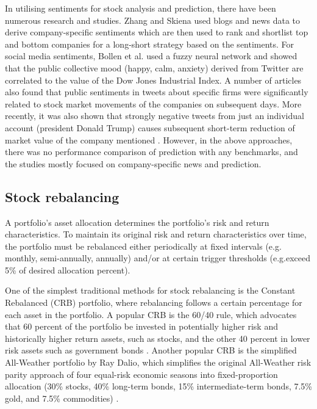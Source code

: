 \documentclass{article}
\begin{document}
In utilising sentiments for stock analysis and prediction, there have been numerous research and studies. Zhang and Skiena \cite{zhang2010trading} used blogs and news data to derive company-specific sentiments which are then used to rank and shortlist top and bottom companies for a long-short strategy based on the sentiments. For social media sentiments, Bollen et al. \cite{Bollen2011} used a fuzzy neural network and showed that the public collective mood (happy, calm, anxiety) derived from Twitter are correlated to the value of the Dow Jones Industrial Index. A number of articles \cite{pagolu2016, SulTwitter2017} also found that public sentiments in tweets about specific firms were significantly related to stock market movements of the companies on subsequent days. More recently, it was also shown that strongly negative tweets from just an individual account (president Donald Trump) causes subsequent short-term reduction of market value of the company mentioned \cite{DonaldTrumpTwitter}. However, in the above approaches, there was no performance comparison of prediction with any benchmarks, and the studies mostly focused on company-specific news and prediction.

\subsection{Stock rebalancing}
A portfolio's asset allocation determines the portfolio's risk and return characteristics. To maintain its original risk and return characteristics over time, the portfolio must be rebalanced either periodically at fixed intervals (e.g. monthly, semi-annually, annually) and/or at certain trigger thresholds (e.g.exceed 5\% of desired allocation percent).

One of the simplest traditional methods for stock rebalancing is the Constant Rebalanced (CRB) portfolio, where rebalancing follows a certain percentage for each asset in the portfolio. A popular CRB is the 60/40 rule, which advocates that 60 percent of the portfolio be invested in potentially higher risk and historically higher return assets, such as stocks, and the other 40 percent in lower risk assets such as government bonds \cite{brett6040}. Another popular CRB is the simplified All-Weather portfolio by Ray Dalio, which simplifies the original All-Weather risk parity approach of four equal-risk economic seasons \cite{bridgewater} into fixed-proportion allocation (30\% stocks, 40\% long-term bonds, 15\% intermediate-term bonds, 7.5\% gold, and 7.5\% commodities) \cite{robbins_2016}.
\end{document}
